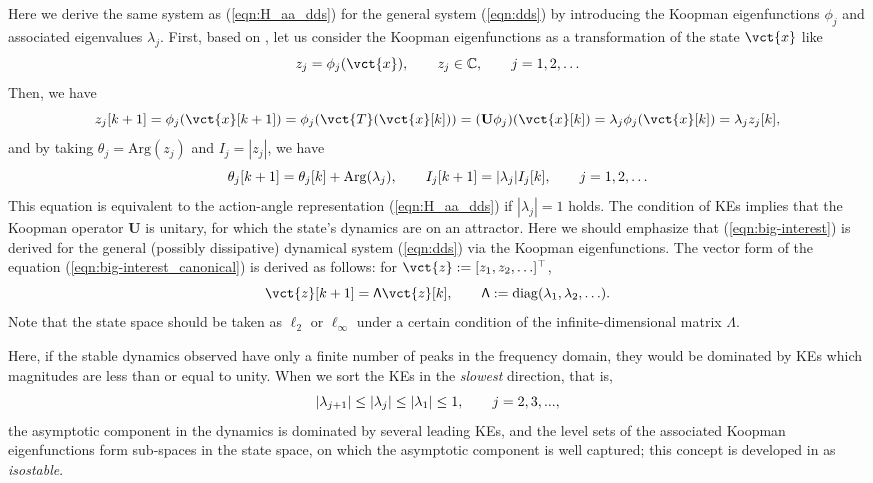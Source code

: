 \documentclass[a4paper,10pt]{article}
\def\bU{{\mathbf{U}}}
\def\bbC{{\mathbb{C}}}
\begin{document}
%
Here we derive the same system as (\ref{eqn:H_aa_dds}) for the general system (\ref{eqn:dds}) by introducing the Koopman eigenfunctions $\phi_j$ and associated eigenvalues $\lambda_j$.  
First, based on \cite{Mauroy_PD261}, let us consider the Koopman eigenfunctions as a transformation of the state $\vct{x}$ like
\[
z_j=\phi_j(\vct{x}),\makebox[2em]{}z_j\in\bbC,\makebox[2em]{}j=1,2,\ldots
\]
Then, we have
\begin{equation}
z_{j}[k+1]=\phi_j(\vct{x}[k+1])=\phi_j(\vct{T}(\vct{x}[k]))=(\bU\phi_j)(\vct{x}[k])=\lambda_j\phi_j(\vct{x}[k])=\lambda_jz_j[k],
\label{eqn:big-interest_canonical}
\end{equation}
and by taking $\theta_j=\mathrm{Arg}(z_j)$ and $I_j=|z_j|$, we have
\begin{equation}
\theta_j[k+1]=\theta_j[k]+\mathrm{Arg}(\lambda_j),\makebox[2em]{}
I_j[k+1]=|\lambda_j|I_j[k],\makebox[2em]{}j=1,2,\ldots
\label{eqn:big-interest}
\end{equation}
This equation is equivalent to the action-angle representation (\ref{eqn:H_aa_dds}) if $|\lambda_j|=1$ holds.  
The condition of KEs implies that the Koopman operator $\bU$ is unitary, for which the state's dynamics are on an attractor.  
Here we should emphasize that (\ref{eqn:big-interest}) is derived for the general (possibly dissipative) dynamical system (\ref{eqn:dds}) via the Koopman eigenfunctions.  
The vector form of the equation (\ref{eqn:big-interest_canonical}) is derived as follows: for $\vct{z}:=[z_1,z_2,\ldots]^\top$,
\begin{equation}
\vct{z}[k+1]=\mathsf{\Lambda}\vct{z}[k],\makebox[2em]{}
\mathsf{\Lambda}:=\mathrm{diag}(\lambda_1,\lambda_2,\ldots).
\label{eqn:big-interest-2}
\end{equation}
Note that the state space should be taken as $\ell_2$ or $\ell_\infty$ under a certain condition of the infinite-dimensional matrix $\mathsf{\Lambda}$.  

%
Here, if the {\color{black}stable} dynamics observed have only a finite number of peaks in the frequency domain, they would be dominated by KEs {\color{black}which magnitudes are less than or equal to unity}. %
When we sort the KEs in the \emph{slowest} direction, that is,
\[
\color{black}
|\lambda_{j+1}|\leq|\lambda_{j}|\leq|\lambda_1|\leq 1,\makebox[2em]{}j=2,3,...,
\]
the asymptotic component in the dynamics is dominated by several leading KEs, and the level sets of the associated Koopman eigenfunctions form sub-spaces in the state space, on which the asymptotic component is well captured; this concept is developed in \cite{Mauroy_PD261} as \emph{isostable}.  
\end{document}
